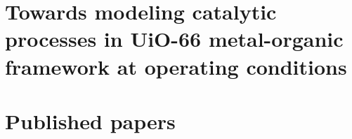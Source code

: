 \documentclass[10pt,twoside]{book}
\newcommand\oddpageleftmark{}
\newcommand\evenpagerightmark{}
\begin{document}
\renewcommand*{\thesection}{\thechapter.\arabic{section}}       %

\graphicspath{{figures/}}


\mainmatter     %
\renewcommand*{\thesection}{\thechapter.\arabic{section}}

\newcommand\fdtsvrightmarktmp{{\scshape\small Chapter }}
\renewcommand\evenpagerightmark{{\scshape\small\chaptername\ \thechapter}}
\renewcommand\oddpageleftmark{{\scshape\small\leftmark}}



\baselineskip 13.0pt

\part{Towards modeling catalytic processes in UiO-66 metal-organic framework at operating conditions}
\graphicspath{{figures/}}





\part{Published papers}
%


\appendix

%
%


% 
\clearpage{\pagestyle{empty}\cleardoublepage}




\cleardoublepage

\end{document}
